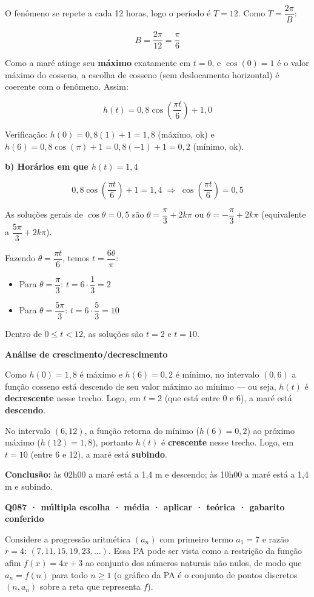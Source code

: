 O fenômeno se repete a cada 12 horas, logo o período é $T=12$. Como $T=\dfrac{2\pi}{B}$:

$$B = \frac{2\pi}{12} = \frac{\pi}{6}$$

Como a maré atinge seu \textbf{máximo} exatamente em $t=0$, e $\cos(0)=1$ é o valor máximo do cosseno, a escolha de cosseno (sem deslocamento horizontal) é coerente com o fenômeno. Assim:

$$h(t) = 0{,}8\cos\!\left(\frac{\pi t}{6}\right) + 1{,}0$$

Verificação: $h(0)=0{,}8(1)+1=1{,}8$ (máximo, ok) e $h(6)=0{,}8\cos(\pi)+1=0{,}8(-1)+1=0{,}2$ (mínimo, ok).

\textbf{b) Horários em que $h(t)=1{,}4$}

$$0{,}8\cos\!\left(\frac{\pi t}{6}\right)+1 = 1{,}4 \;\Rightarrow\; \cos\!\left(\frac{\pi t}{6}\right) = 0{,}5$$

As soluções gerais de $\cos\theta = 0{,}5$ são $\theta = \dfrac{\pi}{3}+2k\pi$ ou $\theta = -\dfrac{\pi}{3}+2k\pi$ (equivalente a $\dfrac{5\pi}{3}+2k\pi$).

Fazendo $\theta = \dfrac{\pi t}{6}$, temos $t = \dfrac{6\theta}{\pi}$:

\begin{itemize}[nosep,leftmargin=*]
\item Para $\theta=\dfrac{\pi}{3}$: $t = 6\cdot\dfrac{1}{3} = 2$
\item Para $\theta=\dfrac{5\pi}{3}$: $t = 6\cdot\dfrac{5}{3} = 10$
\end{itemize}

Dentro de $0\le t<12$, as soluções são $t=2$ e $t=10$.

\textbf{Análise de crescimento/decrescimento}

Como $h(0)=1{,}8$ é máximo e $h(6)=0{,}2$ é mínimo, no intervalo $(0,6)$ a função cosseno está descendo de seu valor máximo ao mínimo — ou seja, $h(t)$ é \textbf{decrescente} nesse trecho. Logo, em $t=2$ (que está entre 0 e 6), a maré está \textbf{descendo}.

No intervalo $(6,12)$, a função retorna do mínimo ($h(6)=0{,}2$) ao próximo máximo ($h(12)=1{,}8$), portanto $h(t)$ é \textbf{crescente} nesse trecho. Logo, em $t=10$ (entre 6 e 12), a maré está \textbf{subindo}.

\textbf{Conclusão:} às 02h00 a maré está a 1,4 m e descendo; às 10h00 a maré está a 1,4 m e subindo.

\bigskip\noindent\textbf{Q087 · múltipla escolha · média · aplicar · teórica · gabarito conferido}\par\nopagebreak
Considere a progressão aritmética $(a_n)$ com primeiro termo $a_1 = 7$ e razão $r = 4$: $(7, 11, 15, 19, 23, \dots)$. Essa PA pode ser vista como a restrição da função afim $f(x) = 4x + 3$ ao conjunto dos números naturais não nulos, de modo que $a_n = f(n)$ para todo $n \geq 1$ (o gráfico da PA é o conjunto de pontos discretos $(n, a_n)$ sobre a reta que representa $f$).

